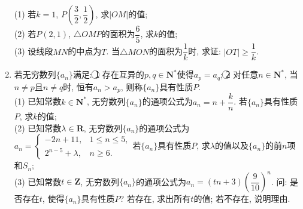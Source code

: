 \documentclass[10pt,a4paper]{article}
\begin{document}
\begin{enumerate}[1.]
(1) 若$k=1$, $P(\dfrac 32,\dfrac 12)$, 求$|OM|$的值;\\
(2) 若$P(2,1)$, $\triangle OMP$的面积为$\dfrac 65$, 求$k$的值;\\
(3) 设线段$MN$的中点为$T$. 当$\triangle MON$的面积为$\dfrac 1k$时, 求证: $|OT|\ge \dfrac 1k$.
\item 若无穷数列$\{a_n\}$满足: \textcircled{1} 存在互异的$p,q\in \mathbf{N}^*$使得$a_p=a_q$; \textcircled{2} 对任意$n\in \mathbf{N}^*$, 当$n\ne p$且$n\ne q$时, 恒有$a_n>a_p$, 则称$\{a_n\}$具有性质$P$.\\
(1) 已知常数$k\in \mathbf{N}^*$, 无穷数列$\{a_n\}$的通项公式为$a_n=n+\dfrac kn$. 若$\{a_n\}$具有性质$P$, 求$k$的值;\\
(2) 已知常数$\lambda \in \mathbf{R}$, 无穷数列$\{a_n\}$的通项公式为$a_n=\begin{cases} -2n+11, & 1\le n\le 5, \\ 2^{n-5}+\lambda, & n\ge 6. \end{cases}$若$\{a_n\}$具有性质$P$, 求$\lambda$的值以及$\{a_n\}$的前$n$项和$S_n$;\\
(3) 已知常数$t\in \mathbf{Z}$, 无穷数列$\{a_n\}$的通项公式为$a_n=(tn+3)(\dfrac 9{10})^n$. 问: 是否存在$t$, 使得$\{a_n\}$具有性质$P$? 若存在, 求出所有$t$的值; 若不存在, 说明理由.


\end{enumerate}
\end{document}
